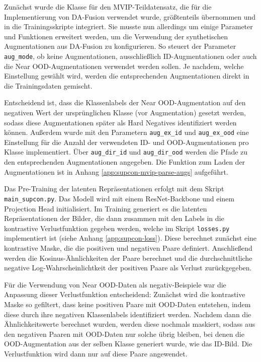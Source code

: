 Zunächst wurde die Klasse für den MVIP-Teildatensatz, die für die Implementierung von DA-Fusion verwendet wurde, größtenteils übernommen und in die Trainingsskripte integriert. Sie musste nun allerdings um einige Parameter und Funktionen erweitert werden, um die Verwendung der synthetischen Augmentationen aus DA-Fusion zu konfigurieren. So steuert der Parameter \lstinline{aug_mode}, ob keine Augmentationen, ausschließlich ID-Augmentationen oder auch die Near OOD-Augmentationen verwendet werden sollen. Je nachdem, welche Einstellung gewählt wird, werden die entsprechenden Augmentationen direkt in die Trainingsdaten gemischt. %

Entscheidend ist, dass die Klassenlabels der Near OOD-Augmentation auf den negativen Wert der ursprünglichen Klasse (vor Augmentation) gesetzt werden, sodass diese Augmentationen später als Hard Negatives identifiziert werden können. Außerdem wurde mit den Parametern \lstinline{aug_ex_id} und \lstinline{aug_ex_ood} eine Einstellung für die Anzahl der verwendeten ID- und OOD-Augmentationen pro Klasse implementiert. Über \lstinline{aug_dir_id} und \lstinline{aug_dir_ood} werden die Pfade zu den entsprechenden Augmentationen angegeben. Die Funktion zum Laden der Augmentationen ist in Anhang \ref{app:supcon-mvip-parse-augs} aufgeführt.

Das Pre-Training der latenten Repräsentationen erfolgt mit dem Skript \lstinline{main_supcon.py}. Das Modell wird mit einem ResNet-Backbone und einem Projection Head initialisiert. Im Training generiert es die latenten Repräsentationen der Bilder, die dann zusammen mit den Labels in die kontrastive Verlustfunktion gegeben werden, welche im Skript \lstinline{losses.py} implementiert ist (siehe Anhang \ref{app:supcon-loss}). Diese berechnet zunächst eine kontrastive Maske, die die positiven und negativen Paare definiert. Anschließend werden die Kosinus-Ähnlichkeiten der Paare berechnet und die durchschnittliche negative Log-Wahrscheinlichtkeit der positiven Paare als Verlust zurückgegeben.

Für die Verwendung von Near OOD-Daten als negativ-Beispiele war die Anpassung dieser Verlustfunktion entscheidend: Zunächst wird die kontrastive Maske so gefiltert, dass keine positiven Paare mit OOD-Daten entstehen, indem diese durch ihre negativen Klassenlabels identifiziert werden. Nachdem dann die Ähnlichkeitswerte berechnet wurden, werden diese nochmals maskiert, sodass aus den negativen Paaren mit OOD-Daten nur solche übrig bleiben, bei denen die OOD-Augmentation aus der selben Klasse generiert wurde, wie das ID-Bild. Die Verlustfunktion wird dann nur auf diese Paare angewendet.

